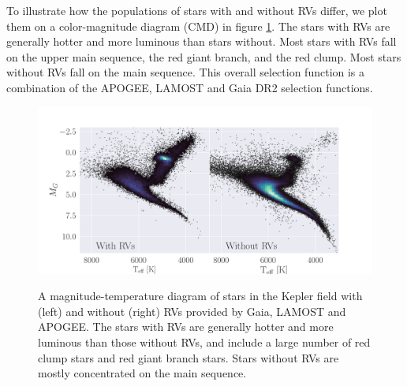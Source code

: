 To illustrate how the populations of stars with and without RVs differ, we
plot them on a color-magnitude diagram (CMD) in figure \ref{fig:CMD}.
The stars with RVs are generally hotter and more luminous than stars without.
Most stars with RVs fall on the upper main sequence, the red giant branch, and
the red clump.
Most stars without RVs fall on the main sequence.
This overall selection function is a combination of the APOGEE, LAMOST and
Gaia DR2 selection functions.
\begin{figure}[ht!]
\caption{
    A magnitude-temperature diagram of stars in the Kepler field with (left)
    and without (right) RVs provided by Gaia, LAMOST and APOGEE.
    The stars with RVs are generally hotter and more luminous than those
    without RVs, and include a large number of red clump stars and red giant
    branch stars.
    Stars without RVs are mostly concentrated on the main sequence.
}
  \centering \includegraphics[width=1\textwidth]{CMD}
\label{fig:CMD}
\end{figure}
